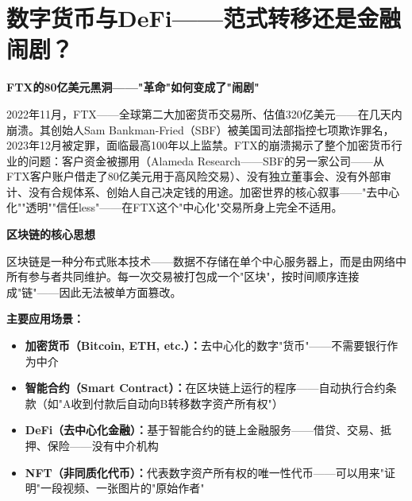 \documentclass[a4paper,11pt]{ctexbook}
\begin{document}

\newpage
\chapter{数字货币与DeFi——范式转移还是金融闹剧？}

\begin{scenario}
\textbf{FTX的80亿美元黑洞——"革命"如何变成了"闹剧"}

2022年11月，FTX——全球第二大加密货币交易所、估值320亿美元——在几天内崩溃。其创始人Sam Bankman-Fried（SBF）被美国司法部指控七项欺诈罪名，2023年12月被定罪，面临最高100年以上监禁。FTX的崩溃揭示了整个加密货币行业的问题：客户资金被挪用（Alameda Research——SBF的另一家公司——从FTX客户账户借走了80亿美元用于高风险交易）、没有独立董事会、没有外部审计、没有合规体系、创始人自己决定钱的用途。加密世界的核心叙事——"去中心化""透明""信任less"——在FTX这个"中心化"交易所身上完全不适用。
\end{scenario}

\begin{qualitative}
\textbf{区块链的核心思想}

区块链是一种分布式账本技术——数据不存储在单个中心服务器上，而是由网络中所有参与者共同维护。每一次交易被打包成一个"区块"，按时间顺序连接成"链"——因此无法被单方面篡改。

\textbf{主要应用场景：}
\begin{itemize}
  \item \textbf{加密货币（Bitcoin, ETH, etc.）：}去中心化的数字"货币"——不需要银行作为中介
  \item \textbf{智能合约（Smart Contract）：}在区块链上运行的程序——自动执行合约条款（如"A收到付款后自动向B转移数字资产所有权"）
  \item \textbf{DeFi（去中心化金融）：}基于智能合约的链上金融服务——借贷、交易、抵押、保险——没有中介机构
  \item \textbf{NFT（非同质化代币）：}代表数字资产所有权的唯一性代币——可以用来"证明"一段视频、一张图片的"原始作者"
\end{itemize}
\end{qualitative}
\end{document}
